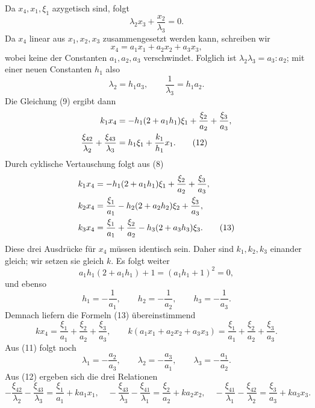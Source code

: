 \documentclass[11pt]{article}
\begin{document}
Da \(x_4,x_1,\xi_1\) azygetisch sind, folgt
\[
 \lambda_2x_3+\frac{x_2}{\lambda_3}=0.
\]
Da \(x_4\) linear aus \(x_1,x_2,x_3\) zusammengesetzt werden kann, schreiben wir
\begin{equation}
 x_4=a_1x_1+a_2x_2+a_3x_3,
 \tag{10}
\end{equation}
wobei keine der Constanten \(a_1,a_2,a_3\) verschwindet. Folglich ist \(\lambda_2\lambda_3=a_3:a_2\); mit einer neuen Constanten \(h_1\) also
\begin{equation}
 \lambda_2=h_1a_3,
 \qquad
 \frac1{\lambda_3}=h_1a_2.
 \tag{11}
\end{equation}
Die Gleichung (9) ergibt dann
\begin{align}
 k_1x_4&=-h_1(2+a_1h_1)\xi_1+\frac{\xi_2}{a_2}+\frac{\xi_3}{a_3},\notag\\
 \frac{\xi_{42}}{\lambda_2}+\frac{\xi_{43}}{\lambda_3}&=h_1\xi_1+\frac{k_1}{h_1}x_1.
 \tag{12}
\end{align}
Durch cyklische Vertauschung folgt aus (8)
\begin{align}
 k_1x_4&=-h_1(2+a_1h_1)\xi_1+\frac{\xi_2}{a_2}+\frac{\xi_3}{a_3},\notag\\
 k_2x_4&=\frac{\xi_1}{a_1}-h_2(2+a_2h_2)\xi_2+\frac{\xi_3}{a_3},\notag\\
 k_3x_4&=\frac{\xi_1}{a_1}+\frac{\xi_2}{a_2}-h_3(2+a_3h_3)\xi_3.
 \tag{13}
\end{align}
Diese drei Ausdrücke für \(x_4\) müssen identisch sein. Daher sind \(k_1,k_2,k_3\) einander gleich; wir setzen sie gleich \(k\). Es folgt weiter
\[
 a_1h_1(2+a_1h_1)+1=(a_1h_1+1)^2=0,
\]
und ebenso
\begin{equation}
 h_1=-\frac1{a_1},\qquad h_2=-\frac1{a_2},\qquad h_3=-\frac1{a_3}.
 \tag{13b}
\end{equation}
Demnach liefern die Formeln (13) übereinstimmend
\begin{equation}
 kx_4=\frac{\xi_1}{a_1}+\frac{\xi_2}{a_2}+\frac{\xi_3}{a_3},
 \qquad
 k(a_1x_1+a_2x_2+a_3x_3)=\frac{\xi_1}{a_1}+\frac{\xi_2}{a_2}+\frac{\xi_3}{a_3}.
 \tag{14}
\end{equation}
Aus (11) folgt noch
\begin{equation}
 \lambda_1=-\frac{a_2}{a_3},
 \qquad
 \lambda_2=-\frac{a_3}{a_1},
 \qquad
 \lambda_3=-\frac{a_1}{a_2}.
 \tag{15}
\end{equation}
Aus (12) ergeben sich die drei Relationen
\[
 -\frac{\xi_{42}}{\lambda_2}-\frac{\xi_{43}}{\lambda_3}=\frac{\xi_1}{a_1}+ka_1x_1,
\quad
 -\frac{\xi_{43}}{\lambda_3}-\frac{\xi_{41}}{\lambda_1}=\frac{\xi_2}{a_2}+ka_2x_2,
\quad
 -\frac{\xi_{41}}{\lambda_1}-\frac{\xi_{42}}{\lambda_2}=\frac{\xi_3}{a_3}+ka_3x_3.
\]
\end{document}
